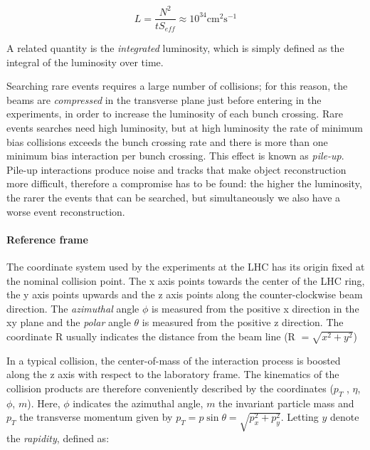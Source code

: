 \[ L = \frac{N^2}{tS_{eff}} \approx 10^{34} \text{cm}^2 \text{s}^{-1}
\]

A related quantity is the \emph{integrated} luminosity, which is simply defined as the integral of the luminosity over time.

Searching rare events requires a large number of collisions; for this reason, the
beams are \emph{compressed} in the transverse plane just before entering in the experiments, in order to increase the luminosity of each bunch crossing. Rare events searches need high luminosity, but at high luminosity the rate
of minimum bias collisions exceeds the
bunch crossing rate and there is more
than one minimum bias interaction per
bunch crossing. This effect is known
as \emph{pile-up}. Pile-up interactions produce noise and tracks that make object
reconstruction more difficult, therefore
a compromise has to be found: the higher
the luminosity, the rarer the events that can
be searched, but simultaneously we also have a worse event reconstruction.

\paragraph{Reference frame}


The coordinate system used by the experiments at the LHC has its origin fixed at the nominal collision point. The x axis points towards the center of the LHC ring, the y axis points
upwards and the z axis points along the counter-clockwise beam direction. The \emph{azimuthal}
angle $\phi$ is measured from the positive x direction in the xy plane and the \emph{polar} angle $\theta$ is
measured from the positive z direction. The coordinate R usually indicates the distance from
the beam line (R $= \sqrt{x^2 + y^2}$)

In a typical collision, the center-of-mass of the interaction process is boosted along the
z axis with respect to the laboratory frame. The kinematics of the collision products are
therefore conveniently described by the coordinates ($p_T$ , $\eta$, $\phi$, $m$). Here, $\phi$ indicates the
azimuthal angle, $m$ the invariant particle mass and $p_T$ the transverse momentum given by $p_T =
p\sin\theta = \sqrt{p_x^2 + p_y^2}$. Letting $y$ denote the \emph{rapidity}, defined as:

